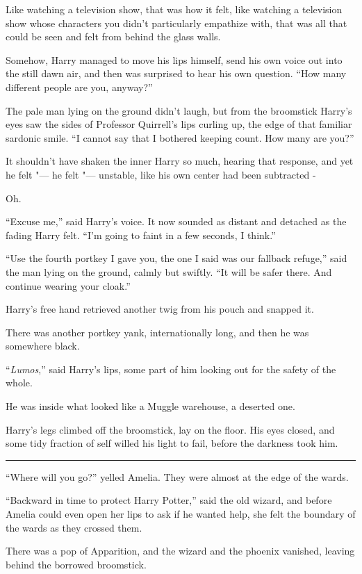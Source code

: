 Like watching a television show, that was how it felt, like watching a
television show whose characters you didn't particularly empathize with,
that was all that could be seen and felt from behind the glass walls.

Somehow, Harry managed to move his lips himself, send his own voice out
into the still dawn air, and then was surprised to hear his own
question. ``How many different people are you, anyway?''

The pale man lying on the ground didn't laugh, but from the broomstick
Harry's eyes saw the sides of Professor Quirrell's lips curling up, the
edge of that familiar sardonic smile. ``I cannot say that I bothered
keeping count. How many are you?''

It shouldn't have shaken the inner Harry so much, hearing that response,
and yet he felt "--- he felt "--- unstable, like his own center had been
subtracted -

Oh.

``Excuse me,'' said Harry's voice. It now sounded as distant and
detached as the fading Harry felt. ``I'm going to faint in a few
seconds, I think.''

``Use the fourth portkey I gave you, the one I said was our fallback
refuge,'' said the man lying on the ground, calmly but swiftly. ``It
will be safer there. And continue wearing your cloak.''

Harry's free hand retrieved another twig from his pouch and snapped it.

There was another portkey yank, internationally long, and then he was
somewhere black.

``\emph{Lumos},'' said Harry's lips, some part of him looking out for the
safety of the whole.

He was inside what looked like a Muggle warehouse, a deserted one.

Harry's legs climbed off the broomstick, lay on the floor. His eyes
closed, and some tidy fraction of self willed his light to fail, before
the darkness took him.

\begin{center}\rule{3in}{0.4pt}\end{center}

``Where will you go?'' yelled Amelia. They were almost at the edge of
the wards.

``Backward in time to protect Harry Potter,'' said the old wizard, and
before Amelia could even open her lips to ask if he wanted help, she
felt the boundary of the wards as they crossed them.

There was a pop of Apparition, and the wizard and the phoenix vanished,
leaving behind the borrowed broomstick.
